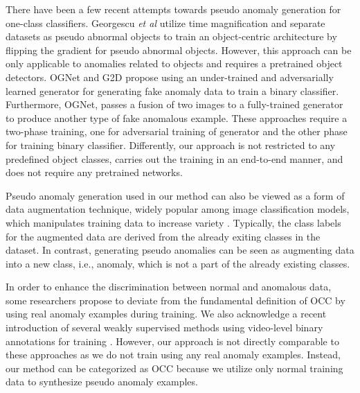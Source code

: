 \documentclass{bmvc2k}
\def\etal{\emph{et al}\bmvaOneDot}
\begin{document}
 There have been a few recent attempts towards pseudo anomaly generation for one-class classifiers. Georgescu \etal \cite{georgescu2021background} utilize time magnification and separate datasets as pseudo abnormal objects to train an object-centric architecture by flipping the gradient for pseudo abnormal objects.
However, this approach can be only applicable to anomalies related to objects and requires a pretrained object detectors.
OGNet \cite{zaheer2020old} and G2D \cite{pourreza2021g2d} propose using an under-trained and adversarially learned generator for generating fake anomaly data to train a binary classifier. Furthermore, OGNet, passes a fusion of two images to a fully-trained generator to produce another type of fake anomalous example.
These approaches require a two-phase training, one for adversarial training of generator and the other phase for training binary classifier.
Differently, our approach is not restricted to any predefined object classes, carries out the training in an end-to-end manner, and does not require any pretrained networks. 


 Pseudo anomaly generation used in our method can also be viewed as a form of data augmentation technique, widely popular among image classification models, which manipulates training data to increase variety \cite{bengio2011deep,krizhevsky2012imagenet,yun2019cutmix,lee2020smoothmix,zhang2018mixup}. Typically, the class labels for the augmented data are derived from the already exiting classes in the dataset. In contrast, generating pseudo anomalies can be seen as augmenting data into a new class, i.e., anomaly, which is not a part of the already existing classes. 

 In order to enhance the discrimination between normal and anomalous data, some researchers \cite{munawar2017limiting, yamanaka2019autoencoding} propose to deviate from the fundamental definition of OCC by using real anomaly examples during training. We also acknowledge a recent introduction of several weakly supervised methods using video-level binary annotations for training \cite{sultani2018real,zaheer2020claws,zhong2019graph}. 
However, our approach is not directly comparable to these approaches as we do not train using any real anomaly examples. Instead, our method can be categorized as OCC because we utilize only normal training data to synthesize pseudo anomaly examples.


\vspace{-4mm}
\end{document}
